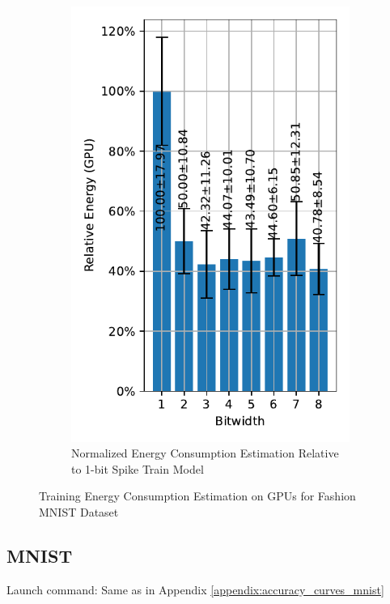 \begin{figure}[H]
\begin{subfigure}[H]{0.48\textwidth}
                \includegraphics[width=\textwidth]{../standard/FashionMNIST/plots/fashionmnist_train_relative_energy_gpu.pdf}
                \caption{Normalized Energy Consumption Estimation Relative to 1-bit Spike Train Model}
            \end{subfigure}
            \caption{Training Energy Consumption Estimation on GPUs for Fashion MNIST Dataset}
        \end{figure}

    \subsection{MNIST}
    \label{appendix:energy_gpu_mnist}
        Launch command: Same as in Appendix \ref{appendix:accuracy_curves_mnist}

